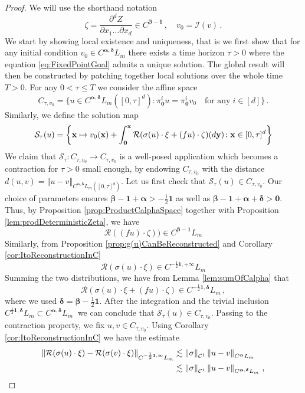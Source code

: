 \documentclass[12pt]{article}
\numberwithin{equation}{section}
\theoremstyle{plain}
\theoremstyle{definition}
\newcommand{\norm}[1]{\left\Vert #1\right\Vert}
\def\cR{\mathcal{R}}\def\cE{\mathcal{E}}
\def\cS{\mathcal{S}}\def\cD{\mathcal{D}}
\def\fy{\mathbf y}\def\fz{\mathbf z}
\def\falpha{{\boldsymbol\alpha}}
\def\fbeta{{\boldsymbol\beta}}
\def\fdelta{{\boldsymbol\delta}}
\def\foo{{\boldsymbol 0}}
\def\fone{{\boldsymbol 1}}
\begin{document}
\begin{proof}
We will use the shorthand notation 
\[\zeta =\frac{\partial^d Z}{\partial x_1\ldots \partial x_d}\in C^{\fbeta- \fone}\,, \quad  v_0=\mathcal{I}(v)\,.\] We start by showing local existence and uniqueness, that is we first show that for any initial condition $v_0\in C^{\falpha,\fdelta}L_m$ there exists a  time horizon $\tau> 0$ 
where the equation \eqref{eq:FixedPointGoal} admits a unique solution. The global result will then be constructed by patching together local solutions over the whole time $T>0$. For any $0<\tau\leq T$ we consider the affine space
    \[
    C_{\tau, v_0} = \{u\in C^{\falpha,\fdelta}L_m([0,\tau]^d)\colon  \pi^i_{\foo}u= \pi^i_{\foo}v_0 \quad \text{for any} \; i\in [d] \}\,.    \]
 Similarly, we define the solution map
    \begin{align*}
    \cS_{\tau}(u) = \left\{\fx\mapsto v_0(\fx)+\int_\foo^\fx \cR(\sigma(u)\cdot\xi + (fu)\cdot\zeta)(d\fy)\colon \fx\in [0,\tau]^d\right\}
    \end{align*}
    We claim that $\cS_{\tau}\colon C_{\tau, v_0}\to C_{\tau, v_0}$ is a well-posed application which becomes a contraction for $\tau>0$ small enough, by endowing  $C_{\tau, v_0}$ with the distance 
  $  d(u,v) = \norm{u-v}_{C^{\falpha,\fdelta}L_m([0,\tau]^d)}$.
   Let us first check that $\cS_{\tau}(u)\in C_{\tau, v_0}$. Our choice of parameters ensures $\fbeta-\fone +\falpha > -\frac 12\fone$ as well as $\fbeta- \fone +\falpha+\fdelta >\foo$. Thus, by Proposition \ref{prop:ProductCalphaSpace} together with Proposition \ref{lem:prodDeterministicZeta},  we have
   \[\mathcal{R}((fu)\cdot\zeta))\in  C^{\fbeta- \fone}L_m\]
   Similarly, from Proposition \ref{prop:g(u)CanBeReconstructed} and Corollary \ref{cor:ItoReconstructionInC}
   \[\cR(\sigma(u)\cdot\xi) \in C^{-\frac 12\fone,+\infty}L_m\]
   Summing the two distributions, we have from Lemma \ref{lem:sumOfCalpha} that 
   \[\cR(\sigma(u)\cdot\xi + (fu)\cdot\zeta)\in C^{-\frac 12\fone,\fdelta}L_m\,,\]
   where we used $\fdelta = \fbeta-\frac 12\fone$. After the integration and the trivial inclusion $C^{\frac12\fone,\fdelta}L_m\subset C^{\falpha,\fdelta}L_m\ $ we can conclude that $\cS_{\tau}(u)\in C_{\tau, v_0}$. Passing to the contraction property,    we fix $u,v\in C_{\tau, v_0}$. Using Corollary \ref{cor:ItoReconstructionInC}  we have the estimate
    \begin{align}
        \norm{\cR(\sigma(u)\cdot\xi)-\cR(\sigma(v)\cdot\xi)}_{C^{-\frac 12\fone,\infty}L_m} &\lesssim \norm{\sigma}_{\cC^1}\norm{u-v}_{C^{\falpha}L_m} \label{ineq:estimateRSigmaXi}  \\    \nonumber    &\lesssim \norm{\sigma}_{\cC^1}\norm{u-v}_{C^{\falpha,\fdelta}L_m}\,,

\end{align}
\end{proof}
\end{document}
